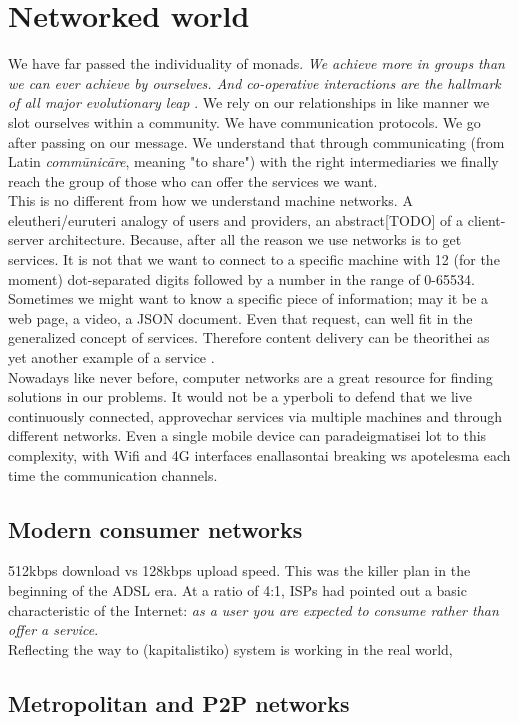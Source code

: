 \newpage
\section{Networked world}
We have far passed the individuality of monads. \emph{We achieve more in groups than we can ever achieve by ourselves. And co-operative interactions are the hallmark of all major evolutionary leap} \cite{Christakis2011}. We rely on our relationships in like manner we slot ourselves within a community. We have communication protocols. We go after passing on our message. We understand that through communicating (from Latin \emph{comm\={u}nic\={a}re}, meaning "to share") with the right intermediaries we finally reach the group of those who can offer the services we want.\\
\indent This is no different from how we understand machine networks.
A eleutheri/euruteri analogy of users and providers, an abstract[TODO] of a client-server architecture.
Because, after all the reason we use networks is to get services.
It is not that we want to connect to a specific machine with 12 (for the moment) dot-separated digits followed by a number in the range of 0-65534.\\
\indent Sometimes we might want to know a specific piece of information; may it be a web page, a video, a JSON document.
Even that request, can well fit in the generalized concept of services.
Therefore content delivery can be theorithei as yet another example of a service \cite{Braun2011}.\\
\indent Nowadays like never before, computer networks are a great resource for finding solutions in our problems.
It would not be a yperboli to defend that we live continuously connected, approvechar services via multiple machines and through different networks.
Even a single mobile device can paradeigmatisei lot to this complexity, with Wifi and 4G interfaces enallasontai breaking ws apotelesma each time the communication channels.\\

\subsection{Modern consumer networks}
512kbps download vs 128kbps upload speed.
This was the killer plan in the beginning of the ADSL era.
At a ratio of 4:1, ISPs  had pointed out a basic characteristic of the Internet: \emph{as a user you are expected to consume rather than offer a service}.\\
\indent Reflecting the way to (kapitalistiko) system is working in the real world, 


\subsection{Metropolitan and P2P networks}